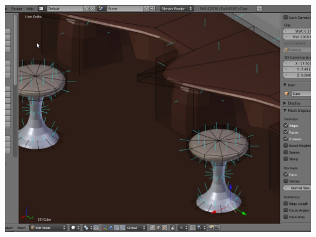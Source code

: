 \documentclass[10pt,a4paper]{article}
\begin{document}
\ \\
\includegraphics[scale=0.4]{Screenshot-3.jpg}\\ 
\ \\
\end{document}
